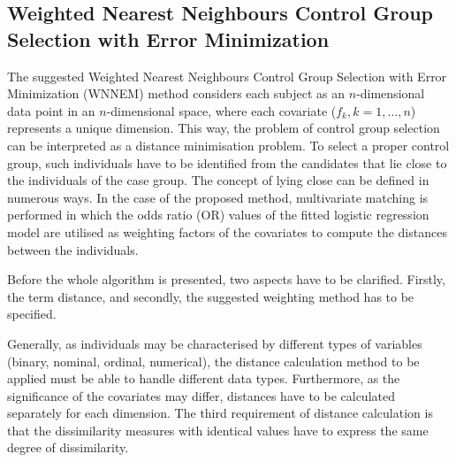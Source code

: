 		\subsection{Weighted Nearest Neighbours Control Group Selection with Error Minimization}
		\label{sec:wnnem}
										
										
		The suggested Weighted Nearest Neighbours Control Group Selection with Error Minimization (WNNEM) method \cite{szeker2020weighted} considers each subject as an $n$-dimensional data point in an $n$-dimensional space, where each covariate ($f_k, k=1, \dots, n$) represents a unique dimension. This way, the problem of control group selection can be interpreted as a distance minimisation problem. To select a proper control group, such individuals have to be identified from the candidates that lie close to the individuals of the case group. The concept of lying close can be defined in numerous ways. In the case of the proposed method, multivariate matching is performed in which the odds ratio (OR) values of the fitted logistic regression model are utilised as weighting factors of the covariates to compute the distances between the individuals.
										
		Before the whole algorithm is presented, two aspects have to be clarified. Firstly, the term distance, and secondly, the suggested weighting method has to be specified.
										
		Generally, as individuals may be characterised by different types of variables (binary, nominal, ordinal, numerical), the distance calculation method to be applied must be able to handle different data types. Furthermore, as the significance of the covariates may differ, distances have to be calculated separately for each dimension. The third requirement of distance calculation is that the dissimilarity measures with identical values have to express the same degree of dissimilarity. 
										
